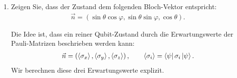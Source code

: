 \documentclass[11pt,a4paper]{scrartcl}
\begin{document}
    \begin{enumerate}[label=(\alph*)]
        \item Zeigen Sie, dass der Zustand dem folgenden Bloch-Vektor entspricht:
        \begin{align*}
            \vec n=
            \left(
                \sin\theta\cos\varphi,
                \sin\theta\sin\varphi,
                \cos\theta
            \right).
        \end{align*}

        \begin{calculationbox}
            Die Idee ist, dass ein reiner Qubit-Zustand durch die Erwartungswerte der Pauli-Matrizen beschrieben werden kann:
            \begin{align*}
                \vec n
                =
                \left(
                    \braket{\sigma_x},
                    \braket{\sigma_y},
                    \braket{\sigma_z}
                \right),
                \qquad
                \braket{\sigma_i}
                =
                \bra{\psi}\sigma_i\ket{\psi}.
            \end{align*}
            Wir berechnen diese drei Erwartungswerte explizit.


\end{calculationbox}
\end{enumerate}
\end{document}
